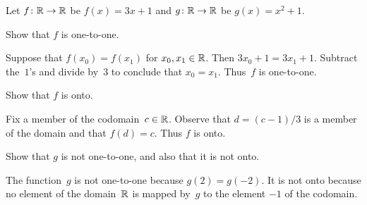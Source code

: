 \documentclass{test}  %
\begin{document}
\begin{problem} 
  Let $\mbox{$f\colon \mathbb{R}\to \mathbb{R}$}$ be $f(x)=3x+1$ and 
  $\mbox{$g\colon \mathbb{R}\to \mathbb{R}$}$ be $g(x)=x^2+1$.
\begin{exes}
\begin{exercise} 
  Show that $f$ is one-to-one.
\end{exercise}
\begin{answer}
  Suppose that $f(x_0)=f(x_1)$ for $x_0,x_1\in\mathbb{R}$.
  Then $3x_0+1=3x_1+1$.
  Subtract the~$1$'s and divide by~$3$ to conclude that $x_0=x_1$.
  Thus~$f$ is one-to-one.   
\end{answer}
\begin{exercise} 
  Show that $f$ is onto.
\end{exercise}
\begin{answer}
  Fix a member of the codomain~$c\in\mathbb{R}$.
  Observe that $d=(c-1)/3$ is a member of the domain and that 
  $f(d)=c$.
  Thus $f$ is onto.  
\end{answer}
\begin{exercise} 
  Show that $g$ is not one-to-one, and also that it is not onto.
\end{exercise}
\begin{answer}
  The function~$g$ is not one-to-one because $g(2)=g(-2)$.
  It is not onto because no element of the domain~$\mathbb{R}$ is mapped by~$g$
  to the element $-1$ of the codomain.          
\end{answer}
\end{exes}
\end{problem}
\end{document}
